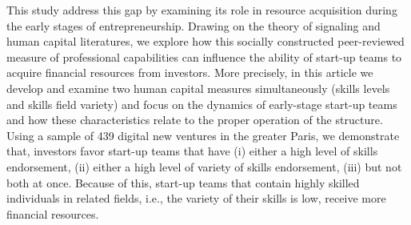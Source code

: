 \documentclass[12pt]{article}
\begin{document}
This study address this gap by examining its role in resource acquisition during the early stages of entrepreneurship. Drawing on the theory of signaling and human capital literatures, we explore how this socially constructed peer-reviewed measure of professional capabilities can influence the ability of start-up teams to acquire financial resources from investors. More precisely, in this article we develop and examine two human capital measures simultaneously (skills levels and skills field variety) and focus on the dynamics of early-stage start-up teams and how these characteristics relate to the proper operation of the structure. Using a sample of 439 digital new ventures in the greater Paris, we demonstrate that, investors favor start-up teams that have (i) either a high level of skills endorsement, (ii) either a high level of variety of skills endorsement, (iii) but not both at once. Because of this, start-up teams that contain highly skilled individuals in related fields, i.e., the variety of their skills is low, receive more financial resources.
\end{document}
